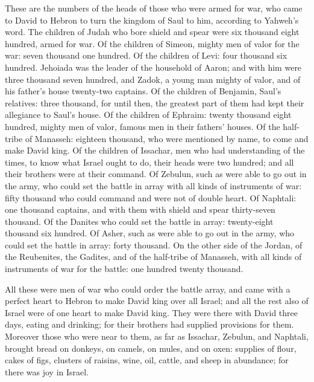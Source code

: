  These are the numbers of the heads of those who were armed
for war, who came to David to Hebron to turn the kingdom of Saul to him,
according to Yahweh's word.  The children of Judah who bore
shield and spear were six thousand eight hundred, armed for war.
 Of the children of Simeon, mighty men of valor for the
war: seven thousand one hundred.  Of the children of Levi:
four thousand six hundred.  Jehoiada was the leader of the
household of Aaron; and with him were three thousand seven hundred,
 and Zadok, a young man mighty of valor, and of his
father's house twenty-two captains.  Of the children of
Benjamin, Saul's relatives: three thousand, for until then, the greatest
part of them had kept their allegiance to Saul's house.  Of
the children of Ephraim: twenty thousand eight hundred, mighty men of
valor, famous men in their fathers' houses.  Of the
half-tribe of Manasseh: eighteen thousand, who were mentioned by name,
to come and make David king.  Of the children of Issachar,
men who had understanding of the times, to know what Israel ought to do,
their heads were two hundred; and all their brothers were at their
command.  Of Zebulun, such as were able to go out in the
army, who could set the battle in array with all kinds of instruments of
war: fifty thousand who could command and were not of double heart.
 Of Naphtali: one thousand captains, and with them with
shield and spear thirty-seven thousand.  Of the Danites who
could set the battle in array: twenty-eight thousand six hundred.
 Of Asher, such as were able to go out in the army, who
could set the battle in array: forty thousand.  On the
other side of the Jordan, of the Reubenites, the Gadites, and of the
half-tribe of Manasseh, with all kinds of instruments of war for the
battle: one hundred twenty thousand.

 All these were men of war who could order the battle
array, and came with a perfect heart to Hebron to make David king over
all Israel; and all the rest also of Israel were of one heart to make
David king.  They were there with David three days, eating
and drinking; for their brothers had supplied provisions for them.
 Moreover those who were near to them, as far as Issachar,
Zebulun, and Naphtali, brought bread on donkeys, on camels, on mules,
and on oxen: supplies of flour, cakes of figs, clusters of raisins,
wine, oil, cattle, and sheep in abundance; for there was joy in Israel.

